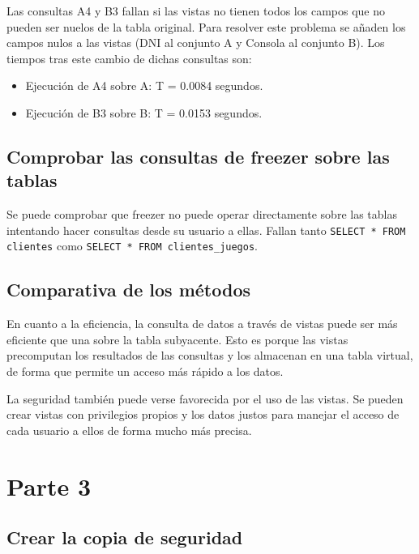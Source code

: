 \documentclass[a4paper, 11pt, oneside]{article} %
\begin{document}
Las consultas A4 y B3 fallan si las vistas no tienen todos los campos que no pueden ser nuelos de la tabla original. Para resolver este problema se añaden los campos nulos a las vistas (DNI al conjunto A y Consola al conjunto B). Los tiempos tras este cambio de dichas consultas son:

\begin{itemize}
	\item Ejecución de A4 sobre A: T = 0.0084 segundos.
	\item Ejecución de B3 sobre B: T = 0.0153 segundos.
\end{itemize}

\subsection{Comprobar las consultas de freezer sobre las tablas}

Se puede comprobar que freezer no puede operar directamente sobre las tablas intentando hacer consultas desde su usuario a ellas. Fallan tanto \texttt{SELECT * FROM clientes} como \texttt{SELECT * FROM clientes_juegos}.

\subsection{Comparativa de los métodos}

En cuanto a la eficiencia, la consulta de datos a través de vistas puede ser más eficiente que una sobre la tabla subyacente. Esto es porque las vistas precomputan los resultados de las consultas y los almacenan en una tabla virtual, de forma que permite un acceso más rápido a los datos.

La seguridad también puede verse favorecida por el uso de las vistas. Se pueden crear vistas con privilegios propios y los datos justos para manejar el acceso de cada usuario a ellos de forma mucho más precisa.


\section{Parte 3}

\subsection{Crear la copia de seguridad}
\end{document}
